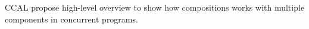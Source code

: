 
CCAL propose high-level overview to show how compositions works with multiple components in concurrent programs. 
